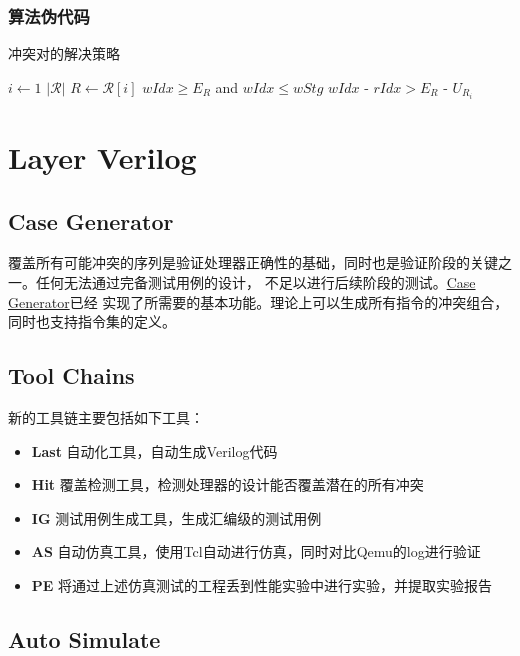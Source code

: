 \documentclass[hyperref,UTF8]{ctexart}
\theoremstyle{definition}
\theoremstyle{remark}
\numberwithin{equation}{subsection}
\newcommand{\Emph}{\textbf}
\begin{document}
	
\subsubsection{算法伪代码}	
	
	冲突对的解决策略
	\begin{codebox}
	\li \For $i \gets 1$ \To $|\mathcal{R}|$
	\li	\Do
			$R \gets \mathcal{R}[i]$
	\li		\If $wIdx \ge E_R$ and $wIdx \le wStg$
	\li			\Then {}
	\li		\ElseIf $wIdx \text{ - } rIdx > E_R \text{ - } U_{R_i}$
	\li			\Then {}
	\li		\ElseNoIf
			\Then
		\End
    \end{codebox}
	
\section{Layer Verilog}
\label{sec:layer_verilog}	

\subsection{Case Generator}

	覆盖所有可能冲突的序列是验证处理器正确性的基础，同时也是验证阶段的关键之一。任何无法通过完备测试用例的设计，
	不足以进行后续阶段的测试。\href{https://github.com/Turf1013/PPC_AutoTool/tree/master/IG}{Case Generator}已经
	实现了所需要的基本功能。理论上可以生成所有指令的冲突组合，同时也支持指令集的定义。

\subsection{Tool Chains}
	
	新的工具链主要包括如下工具：
	\begin{itemize}
		\item \Emph{Last} 自动化工具，自动生成Verilog代码
		\item \Emph{Hit} 覆盖检测工具，检测处理器的设计能否覆盖潜在的所有冲突
		\item \Emph{IG} 测试用例生成工具，生成汇编级的测试用例
		\item \Emph{AS} 自动仿真工具，使用Tcl自动进行仿真，同时对比Qemu的log进行验证
		\item \Emph{PE} 将通过上述仿真测试的工程丢到性能实验中进行实验，并提取实验报告
	\end{itemize}
	
\subsection{Auto Simulate}
\end{document}
